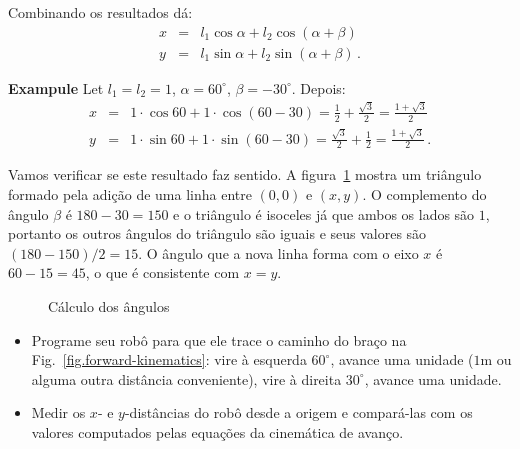 Combinando os resultados dá:
\begin{eqnarray*}
x &=& l_1 \cos \alpha + l_2 \cos(\alpha + \beta)\\
y &=& l_1 \sin \alpha + l_2 \sin(\alpha + \beta)\,.
\end{eqnarray*}

\noindent\textbf{Exampule} Let $l_1 = l_2 = 1$, $\alpha = 60^{\circ}$, $\beta = -30^{\circ}$. Depois:
\begin{eqnarray*}
x &=& 1\cdot\cos 60 + 1\cdot\cos(60-30) = \frac{1}{2} + \frac{\sqrt{3}}{2} = \frac{1+\sqrt{3}}{2}\\
y &=& 1\cdot\sin 60 + 1\cdot\sin(60-30) = \frac{\sqrt{3}}{2} + \frac{1}{2} = \frac{1+\sqrt{3}}{2}\,.
\end{eqnarray*}

Vamos verificar se este resultado faz sentido. A figura~\ref{fig.kinematics-triangle} mostra um triângulo formado pela adição de uma linha entre $(0,0)$ e $(x,y)$. O complemento do ângulo $\beta$ é $180-30=150$ e o triângulo é isoceles já que ambos os lados são $1$, portanto os outros ângulos do triângulo são iguais e seus valores são $(180-150)/2=15$. O ângulo que a nova linha forma com o eixo $x$ é $60-15=45$, o que é consistente com $x=y$.

\begin{figure}
\begin{center}
\end{center}
\caption{Cálculo dos ângulos}\label{fig.kinematics-triangle}
\end{figure}

\begin{framed}
\begin{itemize}
\item Programe seu robô para que ele trace o caminho do braço na Fig.~\ref{fig.forward-kinematics}: vire à esquerda $60^{\circ}$, avance uma unidade ($1$m ou alguma outra distância conveniente), vire à direita $30^{\circ}$, avance uma unidade.
\item Medir os $x$- e $y$-distâncias do robô desde a origem e compará-las com os valores computados pelas equações da cinemática de avanço.
\end{itemize}
\end{framed}


